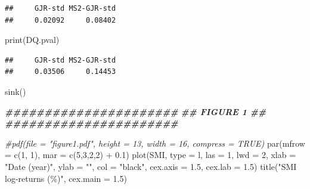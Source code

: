 \documentclass[
]{article}
\newenvironment{Shaded}{\begin{snugshade}}{\end{snugshade}}
\newcommand{\AttributeTok}[1]{\textcolor[rgb]{0.77,0.63,0.00}{#1}}
\newcommand{\CommentTok}[1]{\textcolor[rgb]{0.56,0.35,0.01}{\textit{#1}}}
\newcommand{\DecValTok}[1]{\textcolor[rgb]{0.00,0.00,0.81}{#1}}
\newcommand{\DocumentationTok}[1]{\textcolor[rgb]{0.56,0.35,0.01}{\textbf{\textit{#1}}}}
\newcommand{\FloatTok}[1]{\textcolor[rgb]{0.00,0.00,0.81}{#1}}
\newcommand{\FunctionTok}[1]{\textcolor[rgb]{0.00,0.00,0.00}{#1}}
\newcommand{\NormalTok}[1]{#1}
\newcommand{\SpecialCharTok}[1]{\textcolor[rgb]{0.00,0.00,0.00}{#1}}
\newcommand{\StringTok}[1]{\textcolor[rgb]{0.31,0.60,0.02}{#1}}
\begin{document}
\begin{verbatim}
##     GJR-std MS2-GJR-std 
##     0.02092     0.08402
\end{verbatim}

\begin{Shaded}
\begin{Highlighting}[]
\FunctionTok{print}\NormalTok{(DQ.pval)}
\end{Highlighting}
\end{Shaded}

\begin{verbatim}
##     GJR-std MS2-GJR-std 
##     0.03506     0.14453
\end{verbatim}

\begin{Shaded}
\begin{Highlighting}[]
\FunctionTok{sink}\NormalTok{()}
\end{Highlighting}
\end{Shaded}

\begin{Shaded}
\begin{Highlighting}[]
\DocumentationTok{\#\#\#\#\#\#\#\#\#\#\#\#\#\#\#\#\#\#\#\#\#\#}
\DocumentationTok{\#\#     FIGURE 1     \#\#}
\DocumentationTok{\#\#\#\#\#\#\#\#\#\#\#\#\#\#\#\#\#\#\#\#\#\#}

\CommentTok{\#pdf(file = "figure1.pdf", height = 13, width = 16, compress = TRUE)}
\FunctionTok{par}\NormalTok{(}\AttributeTok{mfrow =} \FunctionTok{c}\NormalTok{(}\DecValTok{1}\NormalTok{, }\DecValTok{1}\NormalTok{), }\AttributeTok{mar =} \FunctionTok{c}\NormalTok{(}\DecValTok{5}\NormalTok{,}\DecValTok{3}\NormalTok{,}\DecValTok{2}\NormalTok{,}\DecValTok{2}\NormalTok{) }\SpecialCharTok{+} \FloatTok{0.1}\NormalTok{)}
\FunctionTok{plot}\NormalTok{(SMI, }\AttributeTok{type =} \StringTok{\textquotesingle{}l\textquotesingle{}}\NormalTok{, }\AttributeTok{las =} \DecValTok{1}\NormalTok{, }\AttributeTok{lwd =} \DecValTok{2}\NormalTok{, }\AttributeTok{xlab =} \StringTok{"Date (year)"}\NormalTok{,}
     \AttributeTok{ylab =} \StringTok{""}\NormalTok{, }\AttributeTok{col =} \StringTok{"black"}\NormalTok{, }\AttributeTok{cex.axis =} \FloatTok{1.5}\NormalTok{, }\AttributeTok{cex.lab =} \FloatTok{1.5}\NormalTok{)}
\FunctionTok{title}\NormalTok{(}\StringTok{"SMI log{-}returns (\%)"}\NormalTok{, }\AttributeTok{cex.main =} \FloatTok{1.5}\NormalTok{)}
\end{Highlighting}
\end{Shaded}
\end{document}
